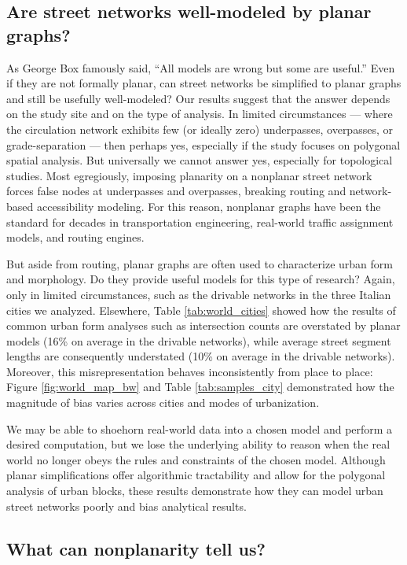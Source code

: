 \documentclass[Afour,sageh,times]{sagej}
\begin{document}
\subsection{Are street networks well-modeled by planar graphs?}

As George Box famously said, \enquote{All models are wrong but some are useful.} Even if they are not formally planar, can street networks be simplified to planar graphs and still be usefully well-modeled? Our results suggest that the answer depends on the study site and on the type of analysis. In limited circumstances --- where the circulation network exhibits few (or ideally zero) underpasses, overpasses, or grade-separation --- then perhaps yes, especially if the study focuses on polygonal spatial analysis. But universally we cannot answer yes, especially for topological studies. Most egregiously, imposing planarity on a nonplanar street network forces false nodes at underpasses and overpasses, breaking routing and network-based accessibility modeling. For this reason, nonplanar graphs have been the standard for decades in transportation engineering, real-world traffic assignment models, and routing engines.

But aside from routing, planar graphs are often used to characterize urban form and morphology. Do they provide useful models for this type of research? Again, only in limited circumstances, such as the drivable networks in the three Italian cities we analyzed. Elsewhere, Table \ref{tab:world_cities} showed how the results of common urban form analyses such as intersection counts are overstated by planar models (16\% on average in the drivable networks), while average street segment lengths are consequently understated (10\% on average in the drivable networks). Moreover, this misrepresentation behaves inconsistently from place to place: Figure \ref{fig:world_map_bw} and Table \ref{tab:samples_city} demonstrated how the magnitude of bias varies across cities and modes of urbanization.

We may be able to shoehorn real-world data into a chosen model and perform a desired computation, but we lose the underlying ability to reason when the real world no longer obeys the rules and constraints of the chosen model. Although planar simplifications offer algorithmic tractability and allow for the polygonal analysis of urban blocks, these results demonstrate how they can model urban street networks poorly and bias analytical results.


\subsection{What can nonplanarity tell us?}
\end{document}
